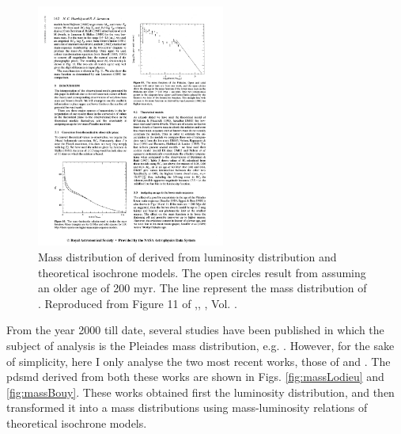 \begin{figure}[ht!]
\begin{center}
\includegraphics[height=8cm]{background/Figures/F11_Hambly1991.pdf}
\caption{Mass distribution of \citet{Hambly1991} derived from luminosity distribution and theoretical isochrone models. The open circles result from assuming an older age of 200 \gls{myr}. The line represent the mass distribution of \citet{1980IAUS...85..157V}. Reproduced from Figure 11 of \citet{Hambly1991},\textit{}, , Vol. .}
\label{fig:massHambly}
\end{center}
\end{figure}

From the year 2000 till date, several studies have been published in which the subject of analysis is the Pleiades mass distribution, e.g. \citet{2000ASPC..198...59H, 2002MNRAS.335..853J, 2001A&A...367..211M,2003A&A...400..891M, 2004A&A...426...75M, 2007MNRAS.380..712L}. However, for the sake of simplicity, here I only analyse the two most recent works, those of \citet{Lodieu2012} and \citet{Bouy2015}. The \gls{pdsmd} derived from both these works are shown in Figs. \ref{fig:massLodieu} and \ref{fig:massBouy}. These works obtained first the luminosity distribution, and then transformed it into a mass distributions using mass-luminosity relations of theoretical isochrone models. 

